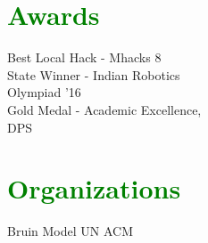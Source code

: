 \documentclass[letterpaper]{deedy-resume-openfont} %
\begin{document}
\begin{minipage}[t]{0.33\textwidth}
\sectionsep %


\section{\textcolor{GREEN}{Awards}}

\textbullet{} Best Local Hack - Mhacks 8 \\
\textbullet{} State Winner - Indian Robotics\\ \hspace{1.5mm} Olympiad '16\\ 
\textbullet{} Gold Medal - Academic Excellence, \\ \hspace{1.5mm} DPS\\


\section{\textcolor{GREEN}{Organizations}}
Bruin Model UN \textbullet{} ACM \\



\end{minipage} %
\hfill
%
%
\end{document}
